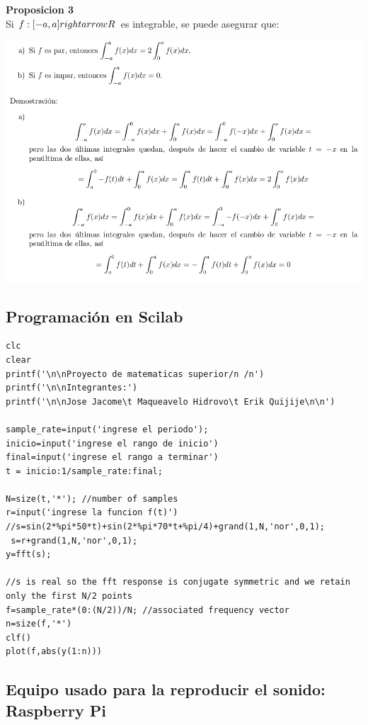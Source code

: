 \documentclass[10pt,a4paper]{book}
\begin{document}
\textbf{Proposicion 3}\\
Si $f:[-a,a] \\rightarrow R  $ es integrable, se puede asegurar que: \\

\begin{center}
	\includegraphics[scale=0.45]{AudioFourier5.png}
\end{center}

\subsection{Programación en Scilab}

\begin{verbatim}
clc 
clear 
printf('\n\nProyecto de matematicas superior/n /n') 
printf('\n\nIntegrantes:') 
printf('\n\nJose Jacome\t Maqueavelo Hidrovo\t Erik Quijije\n\n') 

sample_rate=input('ingrese el periodo'); 
inicio=input('ingrese el rango de inicio') 
final=input('ingrese el rango a terminar') 
t = inicio:1/sample_rate:final; 

N=size(t,'*'); //number of samples 
r=input('ingrese la funcion f(t)') 
//s=sin(2*%pi*50*t)+sin(2*%pi*70*t+%pi/4)+grand(1,N,'nor',0,1); 
 s=r+grand(1,N,'nor',0,1); 
y=fft(s); 

//s is real so the fft response is conjugate symmetric and we retain only the first N/2 points 
f=sample_rate*(0:(N/2))/N; //associated frequency vector 
n=size(f,'*') 
clf() 
plot(f,abs(y(1:n)))
\end{verbatim}

\subsection{Equipo usado para la reproducir el sonido: Raspberry Pi}
\end{document}
